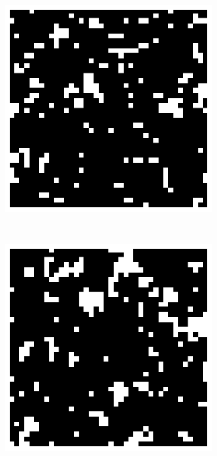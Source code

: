 \documentclass[11pt, a4paper]{report} %
\begin{document}
\begin{figure}[htb]
\begin{subfigure}[c]{0.2\linewidth}
		\includegraphics[width=\linewidth]{20160603125613_40_by_40_Lattice_step10.pdf}
	\end{subfigure}
	~
	\begin{subfigure}[c]{0.2\linewidth}
		\includegraphics[width=\linewidth]{20160603125613_40_by_40_Lattice_step20.pdf}
	\end{subfigure}


\end{figure}
\end{document}
